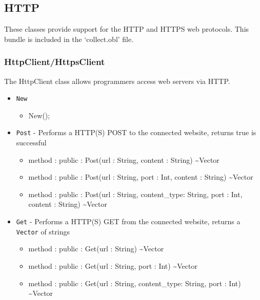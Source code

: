 \documentclass[11pt]{article}
\begin{document}
\subsection{HTTP}
These classes provide support for the HTTP and HTTPS web protocols.  This bundle is included in the `collect.obl' file.

\subsubsection{HttpClient/HttpsClient}
The HttpClient class allows programmers access web servers via HTTP.
\begin{itemize}
\item \texttt{New}
  \begin{itemize}
  \item New();
  \end{itemize}
  
\item \texttt{Post} - Performs a HTTP(S) POST to the connected website,
  returns true is successful
  \begin{itemize}
  \item method : public : Post(url : String, content : String) \textasciitilde Vector
  \item method : public : Post(url : String, port : Int, content :
    String) \textasciitilde Vector
  \item method : public : Post(url : String, content\_type: String,
    port : Int, content : String) \textasciitilde Vector
  \end{itemize}

\item \texttt{Get} - Performs a HTTP(S) GET from the connected website,
  returns a \texttt{Vector} of strings
  \begin{itemize}
  \item method : public : Get(url : String) \textasciitilde Vector
  \item method : public : Get(url : String, port : Int)
    \textasciitilde Vector
  \item method : public : Get(url : String, content\_type: String,
    port : Int) \textasciitilde Vector
  \end{itemize}


\end{itemize}
\end{document}
